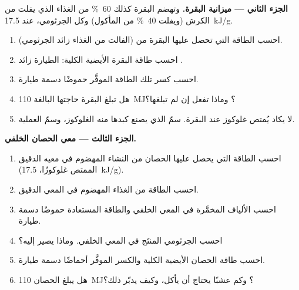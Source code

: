 \begin{problem}
\medskip
\noindent\textbf{الجزء الثاني --- ميزانية البقرة.}
وتهضم البقرة كذلك \qty{60}{\%} من  الغذاء الذي يفلت من
الكرش (ويفلت \qty{40}{\%} من  المأكول) وكل 
الجرثومي، عند \qty{17.5}{kJ/g}.
\begin{enumerate}[resume]
  \item احسب الطاقة التي تحصل عليها البقرة من  (الفالت من
        الغذاء زائد الجرثومي).
  \item احسب طاقة البقرة الأيضية الكلية:  الطيارة
        زائد .
  \item احسب كسر تلك الطاقة الموفَّر حموضًا دسمة طيارة.
  \item هل تبلغ البقرة حاجتها البالغة \qty{110}{MJ}؟ وماذا تفعل إن
        لم تبلغها؟
  \item لا يكاد يُمتص غلوكوز عند البقرة. سمّ  الذي يصنع كبدها
        منه الغلوكوز، وسمّ العملية.
\end{enumerate}

\medskip
\noindent\textbf{الجزء الثالث --- معي الحصان الخلفي.}
\begin{enumerate}[resume]
  \item احسب الطاقة التي يحصل عليها الحصان من النشاء المهضوم في
        معيه الدقيق (الممتص غلوكوزًا، \qty{17.5}{kJ/g}).
  \item احسب الطاقة من  الغذاء المهضوم في المعي الدقيق.
  \item احسب الألياف المخمَّرة في المعي الخلفي والطاقة المستعادة
        حموضًا دسمة طيارة.
  \item احسب  الجرثومي المنتَج في المعي الخلفي. وماذا يصير
        إليه؟
  \item احسب طاقة الحصان الأيضية الكلية والكسر الموفَّر أحماضًا
        دسمة طيارة.
  \item هل يبلغ الحصان \qty{110}{MJ}؟ وكم عشبًا يحتاج أن يأكل، وكيف
        يدبّر ذلك؟
\end{enumerate}


\end{problem}
